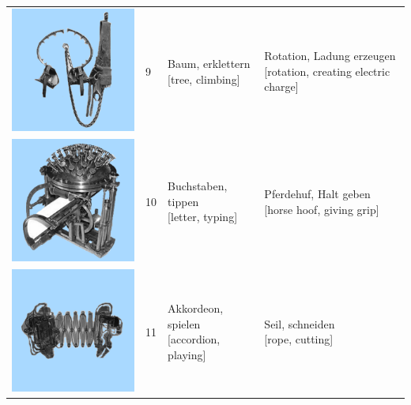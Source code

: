 \documentclass[
  english,
  doc,12pt,twoside,floatsintext]{apa7}
\begin{document}
\begin{center}
\begin{ThreePartTable}
{\begin{longtable}{llll}
\includegraphics[valign=c, scale=0.23]{../materials/unfamiliar/9.png} & 9 & \makecell[l]{Baum, erklettern\\{[tree, climbing]}} & \makecell[l]{Rotation, Ladung erzeugen\\{[rotation, creating electric charge]}}\\
\includegraphics[valign=c, scale=0.23]{../materials/unfamiliar/10.png} & 10 & \makecell[l]{Buchstaben, tippen\\{[letter, typing]}} & \makecell[l]{Pferdehuf, Halt geben\\{[horse hoof, giving grip]}}\\
\includegraphics[valign=c, scale=0.23]{../materials/unfamiliar/11.png} & 11 & \makecell[l]{Akkordeon, spielen\\{[accordion, playing]}} & \makecell[l]{Seil, schneiden\\{[rope, cutting]}}\\

\end{longtable}}
\end{ThreePartTable}
\end{center}
\end{document}
